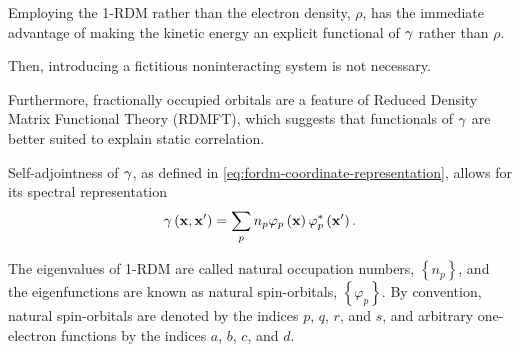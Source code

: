 
Employing the 1-RDM rather than the electron density, $\rho$, has the immediate
advantage of making the kinetic energy an explicit functional of $\gamma$ rather
than $\rho$.

Then, introducing a fictitious noninteracting system is not necessary.

Furthermore, fractionally occupied orbitals are a feature of Reduced Density 
Matrix Functional Theory (RDMFT), which suggests that functionals of $\gamma$ are 
better suited to explain static correlation.

Self-adjointness of $\gamma$, as defined in \cref{eq:fordm-coordinate-representation},
allows for its spectral representation
\begin{equation}
    \gamma \left( \boldsymbol{\mathrm{x}}, \boldsymbol{\mathrm{x}}^{\prime} \right) =
    \sum_{p} n_p 
    \varphi_p \left( \boldsymbol{\mathrm{x}} \right)
    \varphi_p^{*} \left( \boldsymbol{\mathrm{x}}^{\prime} \right)
    .
\end{equation}

The eigenvalues of 1-RDM are called natural occupation numbers,
$\left\{ n_p \right\}$, and the eigenfunctions are known as natural
spin-orbitals, $\left\{ \varphi_p \right\}$.
By convention, natural spin-orbitals are denoted by the indices $p$, $q$, $r$, and $s$, 
and arbitrary one-electron functions by the indices $a$, $b$, $c$, and $d$. 

